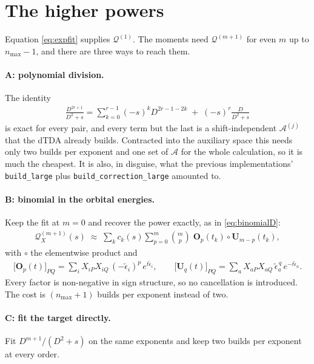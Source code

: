 \documentclass[11pt]{article}
\newcommand{\mat}[1]{{\mathbf{#1}}}
\newcommand{\Dcal}{\mathcal{A}}
\newcommand{\Qcal}{\mathcal{Q}}
\newcommand{\eb}{\tilde{\epsilon}}
\newcommand{\Had}{\circ}
\begin{document}
\section{The higher powers}

Equation \eqref{eq:expfit} supplies $\Qcal^{(1)}$. The moments need $\Qcal^{(m+1)}$ for
even $m$ up to $n_{\max}-1$, and there are three ways to reach them.

\paragraph{A: polynomial division.} The identity
\begin{align}
    \frac{D^{2r+1}}{D^2+s}
    = \sum_{k=0}^{r-1} (-s)^k D^{2r-1-2k} \; + \; (-s)^r \frac{D}{D^2+s}
    \label{eq:division}
\end{align}
is exact for every pair, and every term but the last is a shift-independent $\Dcal^{(j)}$
that the dTDA already builds. Contracted into the auxiliary space this needs only two
builds per exponent and one set of $\Dcal$ for the whole calculation, so it is much the
cheapest. It is also, in disguise, what the previous implementations' \texttt{build\_large}
plus \texttt{build\_correction\_large} amounted to.

\paragraph{B: binomial in the orbital energies.} Keep the fit at $m=0$ and recover the
power exactly, as in \eqref{eq:binomialD}:
\begin{align}
    \Qcal_X^{(m+1)}(s) \;\approx\; \sum_k c_k(s) \sum_{p=0}^{m} \binom{m}{p}\;
      \mat{O}_p(t_k) \Had \mat{U}_{m-p}(t_k) ,
    \label{eq:routeB}
\end{align}
with $\Had$ the elementwise product and
\begin{align}
    \big[\mat{O}_p(t)\big]_{PQ} = \sum_i X_{iP} X_{iQ}\, (-\eb_i)^p\, e^{t \eb_i} ,
    \qquad
    \big[\mat{U}_q(t)\big]_{PQ} = \sum_a X_{aP} X_{aQ}\, \eb_a^{\,q}\, e^{-t \eb_a} .
    \label{eq:OU}
\end{align}
Every factor is non-negative in sign structure, so no cancellation is introduced. The cost
is $(n_{\max}+1)$ builds per exponent instead of two.

\paragraph{C: fit the target directly.} Fit $D^{m+1}/(D^2+s)$ on the same exponents and
keep two builds per exponent at every order.
\end{document}
